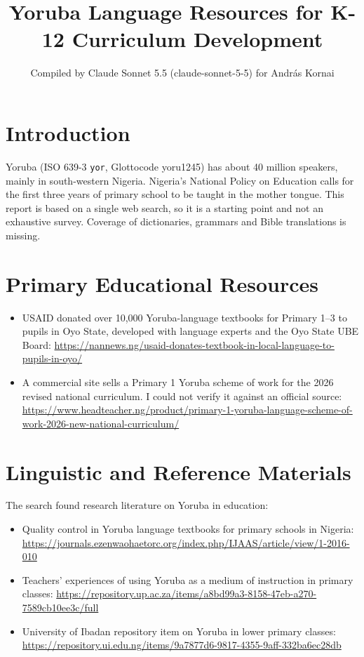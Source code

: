 \documentclass[12pt]{article}
\title{Yoruba Language Resources for K-12 Curriculum Development}
\author{Compiled by Claude Sonnet 5.5 (claude-sonnet-5-5) for Andr\'as Kornai}
\date{}
\begin{document}
\maketitle

\section{Introduction}
Yoruba (ISO 639-3 \texttt{yor}, Glottocode yoru1245) has about 40 million speakers, mainly in south-western Nigeria. Nigeria's National Policy on Education calls for the first three years of primary school to be taught in the mother tongue. This report is based on a single web search, so it is a starting point and not an exhaustive survey. Coverage of dictionaries, grammars and Bible translations is missing.

\section{Primary Educational Resources}
\begin{itemize}
\item USAID donated over 10,000 Yoruba-language textbooks for Primary 1--3 to pupils in Oyo State, developed with language experts and the Oyo State UBE Board: \url{https://nannews.ng/usaid-donates-textbook-in-local-language-to-pupils-in-oyo/}
\item A commercial site sells a Primary 1 Yoruba scheme of work for the 2026 revised national curriculum. I could not verify it against an official source: \url{https://www.headteacher.ng/product/primary-1-yoruba-language-scheme-of-work-2026-new-national-curriculum/}
\end{itemize}

\section{Linguistic and Reference Materials}
The search found research literature on Yoruba in education:
\begin{itemize}
\item Quality control in Yoruba language textbooks for primary schools in Nigeria: \url{https://journals.ezenwaohaetorc.org/index.php/IJAAS/article/view/1-2016-010}
\item Teachers' experiences of using Yoruba as a medium of instruction in primary classes: \url{https://repository.up.ac.za/items/a8bd99a3-8158-47eb-a270-7589cb10ee3c/full}
\item University of Ibadan repository item on Yoruba in lower primary classes: \url{https://repository.ui.edu.ng/items/9a7877d6-9817-4355-9aff-332ba6ec28db}
\end{itemize}
\end{document}
